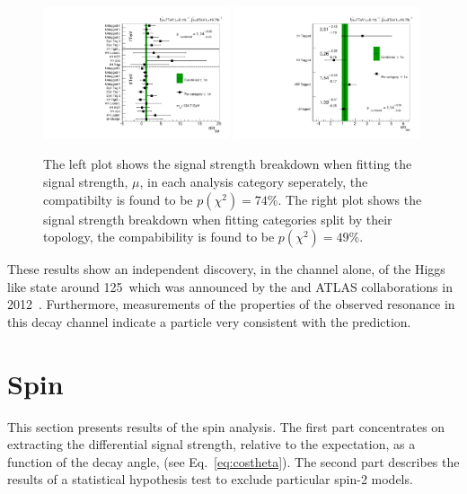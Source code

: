 \begin{figure}
  \includegraphics[width=0.49\textwidth]{results/plots/mva_chcomp.pdf}
  \includegraphics[width=0.49\textwidth]{results/plots/mva_topo_scan.pdf}
  \caption[The observed compatibility of the signal strength between channels]{The left plot shows the signal strength breakdown when fitting the signal strength, $\mu$, in each analysis category seperately, the compatibilty is found to be $p(\chi^{2})=74\%$. The right plot shows the signal strength breakdown when fitting categories split by their topology, the compabibility is found to be $p(\chi^{2})=49\%$.}
  \label{fig:res_chcomp}
\end{figure}

These results show an independent discovery, in the \Hgg channel alone, of the Higgs like state around 125~\GeV which was announced by the \CMS and ATLAS collaborations in 2012~\cite{CMSDiscovery,ATLASDiscovery}. Furthermore, measurements of the properties of the observed resonance in this decay channel indicate a particle very consistent with the \SM prediction.

\section{Spin}
\label{sec:spin_results}

This section presents results of the spin analysis. The first part concentrates on extracting the differential signal strength, relative to the \SM expectation, as a function of the decay angle, \costhetastar (see Eq.~\ref{eq:costheta}). The second part describes the results of a statistical hypothesis test to exclude particular spin-2 models.

